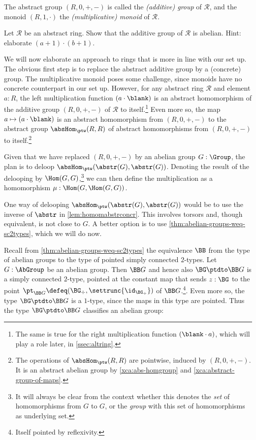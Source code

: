 The abstract group $(R,0,+,-)$ is called the \emph{(additive) group}
of $\mathscr R$, and the monoid $(R,1,\cdot)$ the 
\emph{(multiplicative) monoid} of $\mathscr R$.

\begin{xca}\label{xca:ring-group-abelian}
Let $\mathscr R$ be an abstract ring. Show that the additive group 
of $\mathscr R$ is abelian. Hint: elaborate $(a+1)\cdot(b+1)$.
\end{xca}

We will now elaborate an approach to rings that is more in line
with our set up. The obvious first step is to replace the abstract
additive group by a (concrete) group. The multiplicative monoid
poses some challenge, since monoids have no concrete counterpart in our set up.
However, for any abstract ring $\mathscr R$ and element $a:R$,
the left multiplication function $(a\cdot\blank)$ is an abstract homomorphism 
of the additive group $(R,0,+,-)$ of $\mathscr R$ to itself.\footnote{%
The same is true for the right multiplication function $(\blank\cdot a)$,
which will play a role later, in \cref{ssec:altring}.}
Even more so, the map $a\mapsto(a\cdot\blank)$ is an abstract homomorphism
from $(R,0,+,-)$ to the abstract group $\absHom_{\ptw}(R,R)$
of abstract homomorphisms from $(R,0,+,-)$ to itself.\footnote{%
The operations of $\absHom_{\ptw}(R,R)$ are pointwise,
induced by $(R,0,+,-)$. It is an abstract abelian group by
\cref{xca:abs-homgroup} and \cref{xca:abstract-group-of-maps}.}

Given that we have replaced $(R,0,+,-)$ by an abelian group $G:\Group$,
the plan is to deloop $\absHom_{\ptw}(\abstr(G),\abstr(G))$. 
Denoting the result of the delooping by $\Hom(G,G)$,\footnote{%
It will always be clear from the context whether this denotes
the \emph{set} of homomorphisms from $G$ to $G$, or the \emph{group}
with this set of homomorphisms as underlying set.}
we can then define the multiplication as a homomorphism
$\mu: \Hom(G,\Hom(G,G))$.

One way of delooping $\absHom_{\ptw}(\abstr(G),\abstr(G))$ would be
to use the inverse of $\abstr$ in \cref{lem:homomabstrconcr}.
This involves torsors and, though equivalent, is not close to $G$.  
A better option is to use \cref{thm:abelian-groups-weq-sc2types},
which we will do now.

Recall from \cref{thm:abelian-groups-weq-sc2types} the equivalence
$\BB$ from the type of abelian groups to the type of pointed
simply connected $2$-types. Let $G:\AbGroup$ be an abelian group.
Then $\BB G$ and hence also $\BG\ptdto\BB G$ is a
simply connected $2$-type, pointed at the constant map that sends
$z:\BG$ to the point $\pt_{\BB G}\defeq (\BG_\div,\settrunc{\id_{\BG_\div}})$ 
of $\BB G$.\footnote{Itself pointed by reflexivity.}. Even more so,
the type $\BG\ptdto\BB G$ is a $1$-type, since the maps in this
type are pointed. 
Thus the type $\BG\ptdto\BB G$ classifies an abelian group: 

